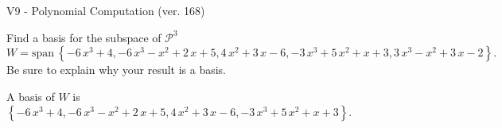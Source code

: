 \begin{exercise}
  \begin{exerciseTitle}V9 - Polynomial Computation (ver. 168)\end{exerciseTitle}
  \begin{exerciseStatement}
    Find a basis for the subspace of \(\mathcal{P}^3\) 
\[W=\mathrm{span}\ \left\{-6 \, x^{3} + 4 , -6 \, x^{3} - x^{2} + 2 \, x + 5 , 4 \, x^{2} + 3 \, x - 6 , -3 \, x^{3} + 5 \, x^{2} + x + 3 , 3 \, x^{3} - x^{2} + 3 \, x - 2\right\}.\]
 Be sure to explain why your result is a basis.


  \end{exerciseStatement}
  \begin{exerciseAnswer}
   A basis of \(W\) is  \(\left\{-6 \, x^{3} + 4 , -6 \, x^{3} - x^{2} + 2 \, x + 5 , 4 \, x^{2} + 3 \, x - 6 , -3 \, x^{3} + 5 \, x^{2} + x + 3\right\}\).
  


  \end{exerciseAnswer}
\end{exercise}